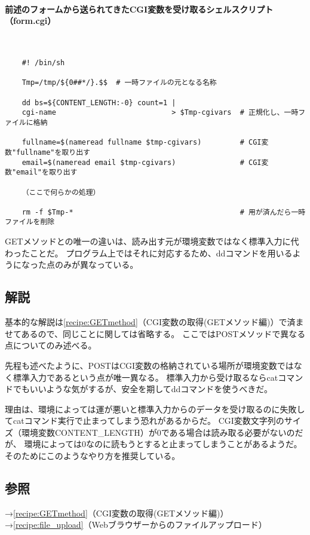 \paragraph{前述のフォームから送られてきたCGI変数を受け取るシェルスクリプト（form.cgi）} 　\\
\begin{frameboxit}{160.0mm}
\begin{verbatim}
	#! /bin/sh
	
	Tmp=/tmp/${0##*/}.$$  # 一時ファイルの元となる名称
	
	dd bs=${CONTENT_LENGTH:-0} count=1 |
	cgi-name                           > $Tmp-cgivars  # 正規化し、一時ファイルに格納
	
	fullname=$(nameread fullname $tmp-cgivars)         # CGI変数"fullname"を取り出す
	email=$(nameread email $tmp-cgivars)               # CGI変数"email"を取り出す
	
	（ここで何らかの処理）
	
	rm -f $Tmp-*                                       # 用が済んだら一時ファイルを削除
\end{verbatim}
\end{frameboxit}

GETメソッドとの唯一の違いは、読み出す元が環境変数ではなく標準入力に代わったことだ。
プログラム上ではそれに対応するため、ddコマンドを用いるようになった点のみが異なっている。

\subsection*{解説}

基本的な解説は\ref{recipe:GETmethod}（CGI変数の取得(GETメソッド編)）で済ませてあるので、同じことに関しては省略する。
ここではPOSTメソッドで異なる点についてのみ述べる。

先程も述べたように、POSTはCGI変数の格納されている場所が環境変数ではなく標準入力であるという点が唯一異なる。
標準入力から受け取るならcatコマンドでもいいような気がするが、安全を期してddコマンドを使うべきだ。

理由は、環境によっては運が悪いと標準入力からのデータを受け取るのに失敗してcatコマンド実行で止まってしまう恐れがあるからだ。
CGI変数文字列のサイズ（環境変数CONTENT\_{}LENGTH）が0である場合は読み取る必要がないのだが、
環境によっては0なのに読もうとすると止まってしまうことがあるようだ。そのためにこのようなやり方を推奨している。

\subsection*{参照}

\noindent
→\ref{recipe:GETmethod}（CGI変数の取得(GETメソッド編)）\\
→\ref{recipe:file_upload}（Webブラウザーからのファイルアップロード）
